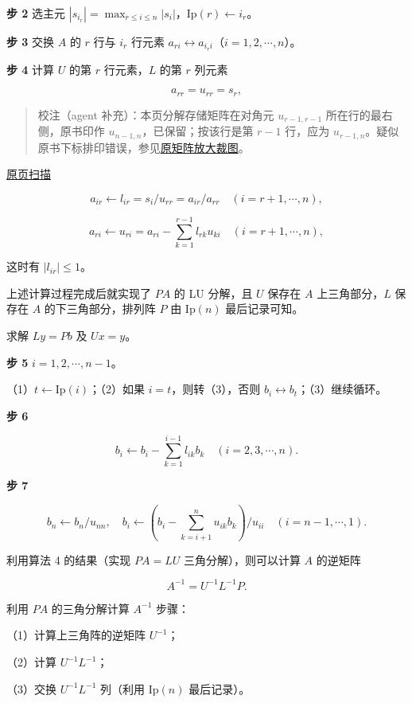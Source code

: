 \documentclass[
  10pt,
  fontset=fandol]{ctexart}
\begin{document}
\textbf{步 2} 选主元 \(|s_{i_r}|=\max_{r\le i\le n}|s_i|\)，\(\mathrm{Ip}(r)\leftarrow i_r\)。

\textbf{步 3} 交换 \(A\) 的 \(r\) 行与 \(i_r\) 行元素 \(a_{ri}\leftrightarrow a_{i_ri}\)（\(i=1,2,\cdots,n\)）。

\textbf{步 4} 计算 \(U\) 的第 \(r\) 行元素，\(L\) 的第 \(r\) 列元素

\[a_{rr}=u_{rr}=s_r,\]

\begin{quote}
校注（agent 补充）：本页分解存储矩阵在对角元 \(u_{r-1,r-1}\) 所在行的最右侧，原书印作 \(u_{n-1,n}\)，已保留；按该行是第 \(r-1\) 行，应为 \(u_{r-1,n}\)。疑似原书下标排印错误，参见\href{../assets/ch07a/pdf-193-storage-detail.png}{原矩阵放大裁图}。
\end{quote}

\href{../../source-images/pdf-194.jpeg}{原页扫描}

\[a_{ir}\leftarrow l_{ir}=s_i/u_{rr}=a_{ir}/a_{rr}\quad(i=r+1,\cdots,n),\]

\[a_{ri}\leftarrow u_{ri}=a_{ri}-\sum_{k=1}^{r-1}l_{rk}u_{ki}\quad(i=r+1,\cdots,n),\]

这时有 \(|l_{ir}|\le1\)。

上述计算过程完成后就实现了 \(PA\) 的 LU 分解，且 \(U\) 保存在 \(A\) 上三角部分，\(L\) 保存在 \(A\) 的下三角部分，排列阵 \(P\) 由 \(\mathrm{Ip}(n)\) 最后记录可知。

求解 \(Ly=Pb\) 及 \(Ux=y\)。

\textbf{步 5} \(i=1,2,\cdots,n-1\)。

（1）\(t\leftarrow\mathrm{Ip}(i)\)；（2）如果 \(i=t\)，则转（3），否则 \(b_i\leftrightarrow b_t\)；（3）继续循环。

\textbf{步 6}

\[b_i\leftarrow b_i-\sum_{k=1}^{i-1}l_{ik}b_k\quad(i=2,3,\cdots,n).\]

\textbf{步 7}

\[b_n\leftarrow b_n/u_{nn},\quad b_i\leftarrow\left(b_i-\sum_{k=i+1}^{n}u_{ik}b_k\right)/u_{ii}\quad(i=n-1,\cdots,1).\]

利用算法 4 的结果（实现 \(PA=LU\) 三角分解），则可以计算 \(A\) 的逆矩阵

\[A^{-1}=U^{-1}L^{-1}P.\]

利用 \(PA\) 的三角分解计算 \(A^{-1}\) 步骤：

（1）计算上三角阵的逆矩阵 \(U^{-1}\)；

（2）计算 \(U^{-1}L^{-1}\)；

（3）交换 \(U^{-1}L^{-1}\) 列（利用 \(\mathrm{Ip}(n)\) 最后记录）。
\end{document}
